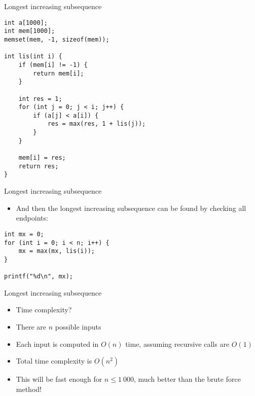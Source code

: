 \documentclass[12pt,t]{beamer}
\newcommand{\bi}{\begin{itemize}}
\newcommand{\ei}{\end{itemize}}
\begin{document}
\begin{frame}[fragile]{Longest increasing subsequence}
    \begin{verbatim}
int a[1000];
int mem[1000];
memset(mem, -1, sizeof(mem));

int lis(int i) {
    if (mem[i] != -1) {
        return mem[i];
    }

    int res = 1;
    for (int j = 0; j < i; j++) {
        if (a[j] < a[i]) {
            res = max(res, 1 + lis(j));
        }
    }

    mem[i] = res;
    return res;
}
    \end{verbatim}
\end{frame}

\begin{frame}[fragile]{Longest increasing subsequence}
    \vspace{30pt}

    \bi
        \item And then the longest increasing subsequence can be found by checking all endpoints:
    \ei

    \begin{verbatim}
int mx = 0;
for (int i = 0; i < n; i++) {
    mx = max(mx, lis(i));
}

printf("%d\n", mx);
    \end{verbatim}
\end{frame}

\begin{frame}{Longest increasing subsequence}
    \vspace{30pt}
    \bi
        \item Time complexity? \pause
            \vspace{10pt}
        \item There are $n$ possible inputs
        \item Each input is computed in $O(n)$ time, assuming recursive calls are $O(1)$
        \item Total time complexity is $O(n^2)$
            \vspace{10pt}
        \item This will be fast enough for $n \leq 1\ 000$, much better than the brute force method!
    \ei
\end{frame}
\end{document}
